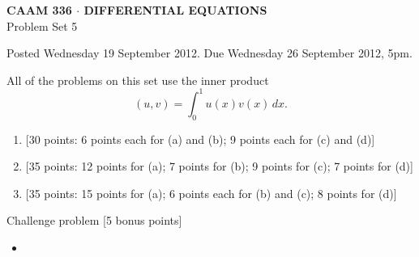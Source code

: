 \documentclass[10pt]{article}
\begin{document}
\begin{center}
\large \textsf{\textbf{CAAM 336 $\cdot$ DIFFERENTIAL EQUATIONS}\\[0.5em]
 Problem Set 5 }
\end{center}

Posted Wednesday 19 September 2012.  Due Wednesday 26 September 2012, 5pm.
 

All of the problems on this set use the inner product
\[ (u,v) = \int_0^1 u(x) v(x)\,dx.\]
\begin{enumerate}
\item {[30 points: 6 points each for (a) and (b); 9 points each for (c) and (d)]}\\  

\vspace*{1em}
\item {[35 points: 12 points for (a); 7 points for (b); 9 points for (c); 7 points for (d)]}\\  


\item {[35 points: 15 points for (a); 6 points each for (b) and (c); 8 points for (d)]}\\  
\end{enumerate}

\vspace*{2em}
Challenge problem [5 bonus points]

\begin{itemize}
\item[]

\end{itemize}
\end{document}
